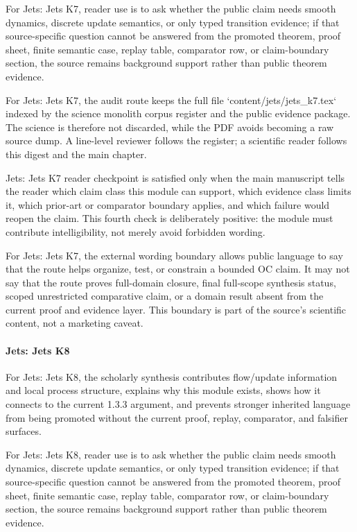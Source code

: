 For Jets: Jets K7, reader use is to ask whether the public claim needs smooth dynamics, discrete update semantics, or only typed transition evidence; if that source-specific question cannot be answered from the promoted theorem, proof sheet, finite semantic case, replay table, comparator row, or claim-boundary section, the source remains background support rather than public theorem evidence.


For Jets: Jets K7, the audit route keeps the full file `content/jets/jets\_k7.tex` indexed by the science monolith corpus register and the public evidence package. The science is therefore not discarded, while the PDF avoids becoming a raw source dump. A line-level reviewer follows the register; a scientific reader follows this digest and the main chapter.


Jets: Jets K7 reader checkpoint is satisfied only when the main manuscript tells the reader which claim class this module can support, which evidence class limits it, which prior-art or comparator boundary applies, and which failure would reopen the claim. This fourth check is deliberately positive: the module must contribute intelligibility, not merely avoid forbidden wording.


For Jets: Jets K7, the external wording boundary allows public language to say that the route helps organize, test, or constrain a bounded OC claim. It may not say that the route proves full-domain closure, final full-scope synthesis status, scoped unrestricted comparative claim, or a domain result absent from the current proof and evidence layer. This boundary is part of the source's scientific content, not a marketing caveat.


\paragraph{Jets: Jets K8}

For Jets: Jets K8, the scholarly synthesis contributes flow/update information and local process structure, explains why this module exists, shows how it connects to the current 1.3.3 argument, and prevents stronger inherited language from being promoted without the current proof, replay, comparator, and falsifier surfaces.


For Jets: Jets K8, reader use is to ask whether the public claim needs smooth dynamics, discrete update semantics, or only typed transition evidence; if that source-specific question cannot be answered from the promoted theorem, proof sheet, finite semantic case, replay table, comparator row, or claim-boundary section, the source remains background support rather than public theorem evidence.


